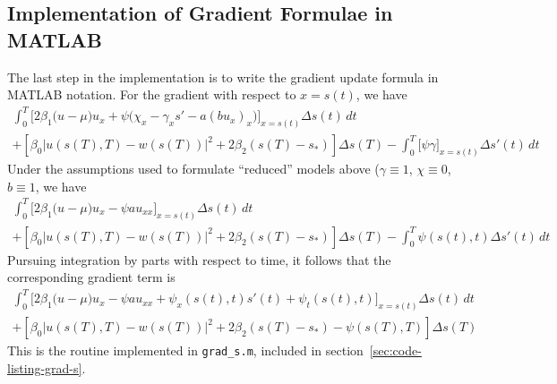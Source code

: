 \documentclass[letterpaper, 10pt]{amsart}
\theoremstyle{definition}
\theoremstyle{remark}
\newcommand{\D}[2]{\frac{\partial{} #1}{\partial{} #2}}
\newcommand{\lnorm}[1]{\left\vert #1\right\vert}%
\begin{document}
\subsection{Implementation of Gradient Formulae in MATLAB}
The last step in the implementation is to write the gradient update formula in MATLAB notation.
For the gradient with respect to $x=s(t)$, we have
\begin{gather*}
  \int_0^T \Big[2\beta_1\big(u - \mu\big)u_x + \psi \big(\chi_x - \gamma_x s'  - a (b u_x)_x \big)\Big]_{x=s(t)} {\Delta s}(t)\,dt \nonumber
  \\
  +
  \left[\beta_0\lnorm{u(s(T),T) - w(s(T))}^2 + 2 \beta_2 (s(T) - s_*)\right] {\Delta s}(T) 
  - \int_0^T \big[\psi \gamma\big]_{x=s(t)} {\Delta s}'(t) \,dt
\end{gather*}
Under the assumptions used to formulate ``reduced'' models above ($\gamma \equiv 1$, $\chi \equiv 0$, $b\equiv 1$, we have
\begin{gather*}
  \int_0^T \Big[2\beta_1\big(u - \mu\big)u_x - \psi  a u_{xx} \Big]_{x=s(t)} {\Delta s}(t)\,dt \nonumber
  \\
  +
  \left[\beta_0\lnorm{u(s(T),T) - w(s(T))}^2 + 2 \beta_2 (s(T) - s_*)\right] {\Delta s}(T) 
  - \int_0^T \psi(s(t),t) {\Delta s}'(t) \,dt
\end{gather*}
Pursuing integration by parts with respect to time, it follows that the corresponding gradient term is
\begin{gather*}
  \int_0^T \Big[2\beta_1\big(u - \mu\big)u_x - \psi  a u_{xx}
  + \psi_x(s(t),t) s'(t) + \psi_t(s(t),t)\Big]_{x=s(t)} {\Delta s}(t)\,dt \nonumber
  \\
  +
  \left[\beta_0\lnorm{u(s(T),T) - w(s(T))}^2 + 2 \beta_2 (s(T) - s_*) - \psi(s(T),T)\right] {\Delta s}(T) 
\end{gather*}
This is the routine implemented in \verb+grad_s.m+, included in section~\ref{sec:code-listing-grad-s}.
\end{document}
